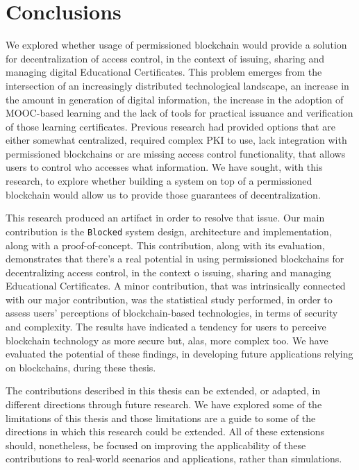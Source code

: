 \section{Conclusions}

We explored whether usage of permissioned blockchain would provide a solution for decentralization of access control, in the context of issuing, sharing and managing digital Educational Certificates. This problem emerges from the intersection of an increasingly distributed technological landscape, an increase in the amount in generation of digital information, the increase in the adoption of MOOC-based learning and the lack of tools for practical issuance and verification of those learning certificates. Previous research had provided options that are either somewhat centralized, required complex PKI to use, lack integration with permissioned blockchains or are missing access control functionality, that allows users to control who accesses what information. We have sought, with this research, to explore whether building a system on top of a permissioned blockchain would allow us to provide those guarantees of decentralization.

This research produced an artifact in order to resolve that issue. Our main contribution is the \texttt{Blocked} system design, architecture and implementation, along with a proof-of-concept. This contribution, along with its evaluation, demonstrates that there's a real potential in using permissioned blockchains for decentralizing access control, in the context o issuing, sharing and managing Educational Certificates. A minor contribution, that was intrinsically connected with our major contribution, was the statistical study performed, in order to assess users' perceptions of blockchain-based technologies, in terms of security and complexity. The results have indicated a tendency for users to perceive blockchain technology as more secure but, alas, more complex too. We have evaluated the potential of these findings, in developing future applications relying on blockchains, during these thesis.

The contributions described in this thesis can be extended, or adapted, in different directions through future research. We have explored some of the limitations of this thesis and those limitations are a guide to some of the directions in which this research could be extended. All of these extensions should, nonetheless, be focused on improving the applicability of these contributions to real-world scenarios and applications, rather than simulations.